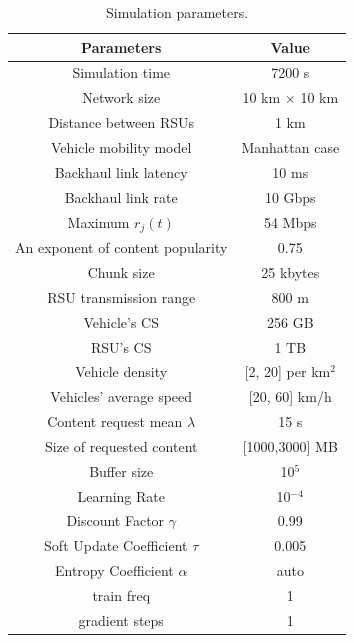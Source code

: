 \documentclass{aims}
\numberwithin{equation}{section}
\begin{document}
\begin{table}[H] %
    \caption{Simulation parameters.}
    \centering
    \begin{tabular}{cc}
        \hline
        \textbf{Parameters} & \textbf{Value} \\
        \hline
        Simulation time & 7200 s\\
        Network size & 10 km $\times$ 10 km\\
        Distance between RSUs & 1 km\\
        Vehicle mobility model & Manhattan case \\
        
        Backhaul link latency & 10 ms\\
        Backhaul link rate & 10 Gbps\\
        Maximum $r_{j}(t)$ & 54 Mbps\\
        
        An exponent of content popularity & 0.75\\
        Chunk size & 25 kbytes\\
        
        RSU transmission range & 800 m\\
        
        Vehicle's CS & 256 GB\\
        RSU's CS & 1 TB\\

        Vehicle density & [2, 20] per {km}$^{2}$\\
        Vehicles' average speed & [20, 60] km/h\\
        Content request mean $\lambda$ & 15 s\\
        Size of requested content & [1000,3000] MB \\

        Buffer size & 10$^{5}$ \\
        Learning Rate & 10$^{-4}$ \\
        Discount Factor $\gamma$ & 0.99 \\
        Soft Update Coefficient $\tau$ & 0.005 \\
        Entropy Coefficient $\alpha$ & auto \\
        train freq & 1 \\
        gradient steps & 1 \\
        \hline
    \end{tabular}
    \label{table1}
\end{table}
\end{document}
